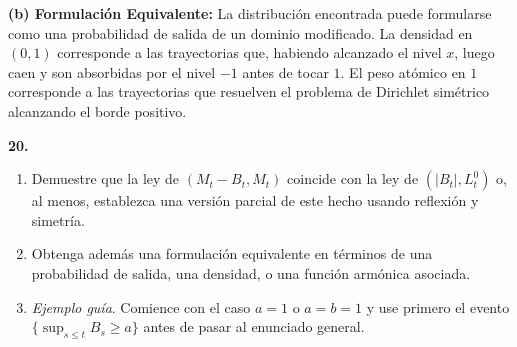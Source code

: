 \documentclass[11pt, letterpaper]{article}
\begin{document}
\begin{solucion}
    \textbf{(b) Formulación Equivalente:}
    La distribución encontrada puede formularse como una probabilidad de salida de un dominio modificado. La densidad en $(0,1)$ corresponde a las trayectorias que, habiendo alcanzado el nivel $x$, luego caen y son absorbidas por el nivel $-1$ antes de tocar $1$. El peso atómico en $1$ corresponde a las trayectorias que resuelven el problema de Dirichlet simétrico alcanzando el borde positivo.
\end{solucion}

\newpage

\begin{ejercicio}
    \textbf{20.} 
    \begin{enumerate}
        \item Demuestre que la ley de $(M_t - B_t, M_t)$ coincide con la ley de $(|B_t|, L_t^0)$ o, al menos, establezca una versión parcial de este hecho usando reflexión y simetría.
        \item Obtenga además una formulación equivalente en términos de una probabilidad de salida, una densidad, o una función armónica asociada.
        \item \textit{Ejemplo guía}. Comience con el caso $a = 1$ o $a = b = 1$ y use primero el evento $\{\sup_{s \le t} B_s \ge a\}$ antes de pasar al enunciado general.
    \end{enumerate}
\end{ejercicio}

 \vspace{5mm}
\end{document}
